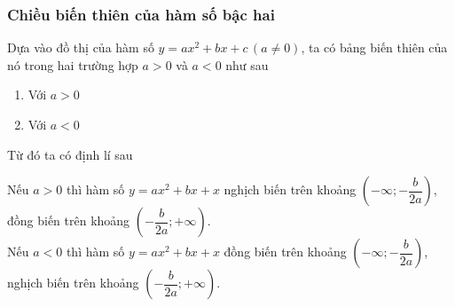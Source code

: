 \subsubsection{Chiều biến thiên của hàm số bậc hai}
Dựa vào đồ thị của hàm số $y=ax^2+bx+c\, (a\ne 0)$, ta có bảng biến thiên của nó trong hai trường hợp $a>0$ và $a<0$ như sau
\begin{enumerate}[+]
    \item Với $a>0$
    \begin{center}
    \end{center}
\item Với $a<0$
 \begin{center}
\end{center}
\end{enumerate}
Từ đó ta có định lí sau
\begin{dl}
Nếu $a>0$ thì hàm số $y=ax^2+bx+x$ nghịch biến trên khoảng $\left(-\infty;-\dfrac{b}{2a}\right)$, đồng biến trên khoảng $\left(-\dfrac{b}{2a};+\infty\right)$.\\
Nếu $a<0$ thì hàm số $y=ax^2+bx+x$ đồng biến trên khoảng $\left(-\infty;-\dfrac{b}{2a}\right)$, nghịch biến trên khoảng $\left(-\dfrac{b}{2a};+\infty\right)$. 
\end{dl}

